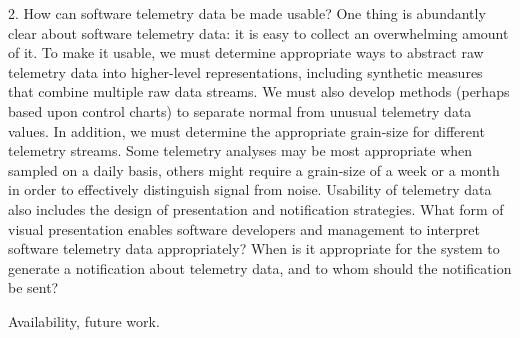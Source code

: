 \documentclass[11pt,twocolumn]{article}
\begin{document}
   2. How can software telemetry data be made usable? One thing is
   abundantly clear about software telemetry data: it is easy to collect an
   overwhelming amount of it.  To make it usable, we must determine
   appropriate ways to abstract raw telemetry data into higher-level
   representations, including synthetic measures that combine multiple raw
   data streams. We must also develop methods (perhaps based upon control
   charts) to separate normal from unusual telemetry data values. In
   addition, we must determine the appropriate grain-size for different
   telemetry streams.  Some telemetry analyses may be most appropriate when
   sampled on a daily basis, others might require a grain-size of a week or
   a month in order to effectively distinguish signal from noise. Usability
   of telemetry data also includes the design of presentation and
   notification strategies.  What form of visual presentation enables
   software developers and management to interpret software telemetry data
   appropriately?  When is it appropriate for the system to generate a
   notification about telemetry data, and to whom should the notification
   be sent?

Availability, future work.




\end{document}

